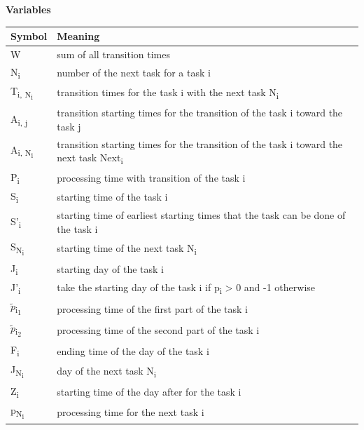 \documentclass[fleqn,10pt]{wlscirep}
\begin{document}
\noindent \textbf{Variables}

\begin{table}[ht]
\centering
\begin{tabular}{|l|l|}
\hline
Symbol & Meaning \\
\hline
W & sum of all transition times \\%
\hline
N\textsubscript{i} & number of the next task for a task i  \\%
\hline
T\textsubscript{i, N\textsubscript{i}} & transition times for the task i with the next task N\textsubscript{i} \\%
\hline
A\textsubscript{i, j} & transition starting times for the transition of the task i toward the task j  \\ %
\hline
A\textsubscript{i, N\textsubscript{i}} & transition starting times for the transition of the task i toward the next task Next\textsubscript{i}  \\ %
\hline
P\textsubscript{i} & processing time with transition of the task i  \\%
\hline
S\textsubscript{i} & starting time of the task i  \\%
\hline
S'\textsubscript{i} & starting time of earliest starting times that the task can be done of the task i  \\
\hline
S\textsubscript{N\textsubscript{i}} & starting time of the next task N\textsubscript{i}  \\ 
\hline
J\textsubscript{i} & starting day of the task i  \\ %
\hline
J'\textsubscript{i} & take the starting day of the task i if p\textsubscript{i} > 0 and -1 otherwise \\ %
\hline
$\tilde{p}$\textsubscript{i\textsubscript{1}}  & processing time of the first part of the task i \\ %
\hline
$\tilde{p}$\textsubscript{i\textsubscript{2}}  & processing time of the second part of the task i \\ %
\hline
F\textsubscript{i}  & ending time of the day of the task i \\ %
\hline
J\textsubscript{N\textsubscript{i}}  & day of the next task N\textsubscript{i} \\ 
\hline
Z\textsubscript{i}  & starting time of the day after for the task i \\ 
\hline
p\textsubscript{N\textsubscript{i}}  & processing time for the next task i \\

\end{tabular}
\end{table}
\end{document}

